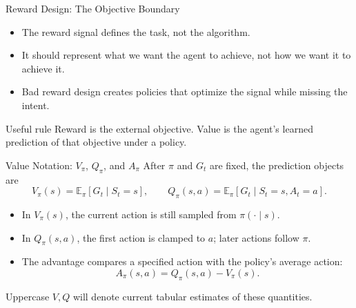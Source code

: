 \documentclass[aspectratio=169]{beamer}
\newcommand{\EE}{\mathbb{E}}
\begin{document}
\begin{frame}{Reward Design: The Objective Boundary}
\small
\begin{itemize}
    \item The reward signal defines the task, not the algorithm.
    \item It should represent what we want the agent to achieve, not how we want it to achieve it.
    \item Bad reward design creates policies that optimize the signal while missing the intent.
\end{itemize}

\vspace{0.8em}
\begin{block}{Useful rule}
Reward is the external objective. Value is the agent's learned prediction of that objective under a policy.
\end{block}
\end{frame}

\begin{frame}{Value Notation: $V_\pi$, $Q_\pi$, and $A_\pi$}
\small
After $\pi$ and $G_t$ are fixed, the prediction objects are
\[
V_\pi(s)=\EE_\pi[G_t\mid S_t=s],
\qquad
Q_\pi(s,a)=\EE_\pi[G_t\mid S_t=s,A_t=a].
\]

\vspace{0.4em}
\begin{itemize}
    \item In $V_\pi(s)$, the current action is still sampled from $\pi(\cdot\mid s)$.
    \item In $Q_\pi(s,a)$, the first action is clamped to $a$; later actions follow $\pi$.
    \item The advantage compares a specified action with the policy's average action:
    \[
    A_\pi(s,a)=Q_\pi(s,a)-V_\pi(s).
    \]
\end{itemize}

\vspace{0.3em}
Uppercase $V,Q$ will denote current tabular estimates of these quantities.
\end{frame}
\end{document}
